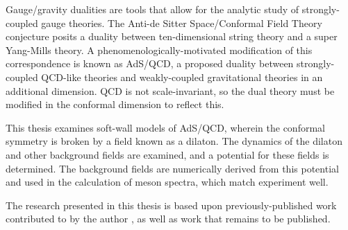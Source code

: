 

Gauge/gravity dualities are tools that allow for the analytic study of strongly-coupled gauge theories.
The Anti-de Sitter Space/Conformal Field Theory conjecture posits a duality between ten-dimensional string theory and a super Yang-Mills theory.
A phenomenologically-motivated modification of this correspondence is known as AdS/QCD, a proposed duality between strongly-coupled QCD-like theories and weakly-coupled gravitational theories in an additional dimension.
QCD is not scale-invariant, so the dual theory must be modified in the conformal dimension to reflect this. 

This thesis examines soft-wall models of AdS/QCD, wherein the conformal symmetry is broken by a field known as a dilaton.
The dynamics of the dilaton and other background fields are examined, and a potential for these fields is determined.
The background fields are numerically derived from this potential and used in the calculation of meson spectra, which match experiment well.

The research presented in this thesis is based upon previously-published work contributed to by the author \cite{bartz-pions, Bartz2014}, as well as work that remains to be published.